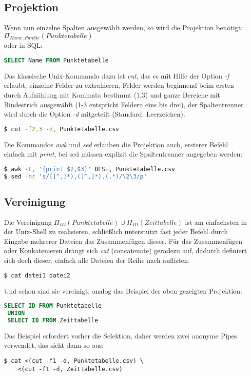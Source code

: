 \subsection{Projektion}
Wenn nun einzelne Spalten ausgewählt werden, so wird die Projektion benötigt:\\
{$\Pi_{Name,Punkte}(Punktetabelle)$}\\

oder in SQL:
\begin{lstlisting}[language=SQL]
 SELECT Name FROM Punktetabelle
\end{lstlisting}
Das klassische Unix-Kommando dazu ist \textit{cut}, das es mit Hilfe der Option \textit{-f} erlaubt, einzelne Felder zu extrahieren, Felder werden beginnend beim ersten durch Aufzählung mit Kommata bestimmt (1,3) und ganze Bereiche mit Bindestrich ausgewählt (1-3 entspricht Feldern eins bis drei), der Spaltentrenner wird durch die Option \textit{-d} mitgeteilt (Standard: Leerzeichen).
\begin{lstlisting}[language=Bash]
$ cut -f2,3 -d, Punktetabelle.csv
\end{lstlisting}
Die Kommandos \textit{awk} und \textit{sed} erlauben die Projektion auch, ersterer Befehl einfach mit \textit{print}, bei sed müssen explizit die Spaltentrenner angegeben werden:
\begin{lstlisting}[language=Bash]
$ awk -F, '{print $2,$3}' OFS=, Punktetabelle.csv
$ sed -nr 's/([^,]*),([^,]*),(.*)/\2\3/p'
\end{lstlisting}
\subsection{Vereinigung}
Die Vereinigung $\Pi_{ID}(Punktetabelle) \cup \Pi_{ID}(Zeittabelle)$ ist am einfachsten in der Unix-Shell zu realisieren, schließlich unterstützt fast jeder Befehl durch Eingabe mehrerer Dateien das Zusammenfügen dieser. Für das Zusammenfügen oder Konkatenieren drängt sich \textit{cat} (concatenate) geradezu auf, dadurch definiert sich doch dieser, einfach alle Dateien der Reihe nach auflisten:
\begin{lstlisting}[language=Bash]
$ cat datei1 datei2
\end{lstlisting}
Und schon sind sie vereinigt, analog das Beispiel der oben gezeigten Projektion:
\begin{lstlisting}[language=SQL]
 SELECT ID FROM Punktetabelle
 UNION
 SELECT ID FROM Zeittabelle
\end{lstlisting}
Das Beispiel erfordert vorher die Selektion, daher werden zwei anonyme Pipes verwendet, das sieht dann so aus:
\begin{lstlisting}
$ cat <(cut -f1 -d, Punktetabelle.csv) \
	<(cut -f1 -d, Zeittabelle.csv)
\end{lstlisting}

